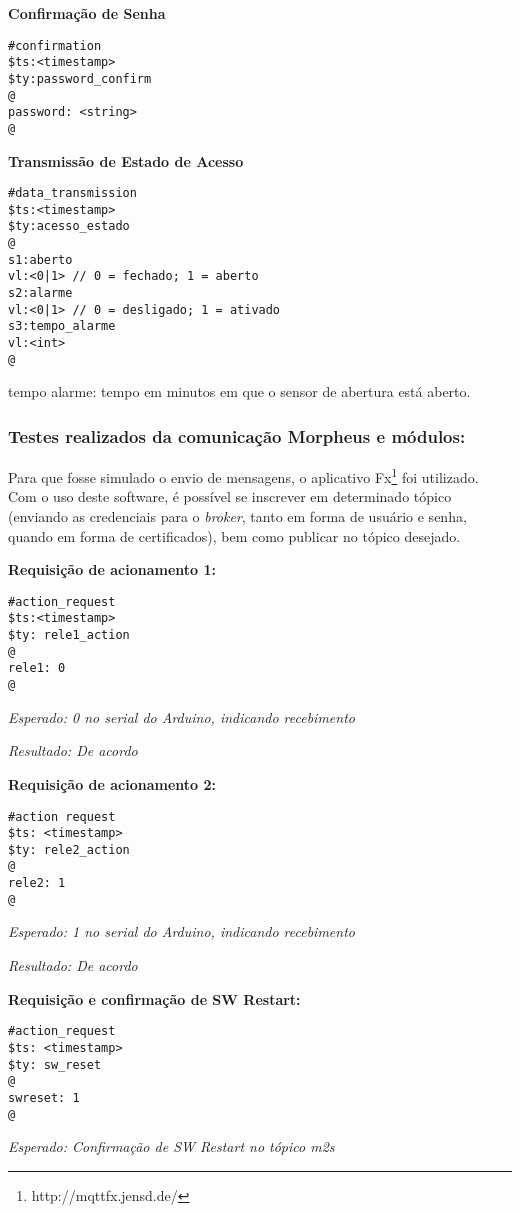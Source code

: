 \textbf{Confirmação de Senha}
\begin{lstlisting}
#confirmation
$ts:<timestamp>
$ty:password_confirm
@
password: <string>
@
\end{lstlisting}

\textbf{Transmissão de Estado de Acesso}
\begin{lstlisting}
#data_transmission
$ts:<timestamp>
$ty:acesso_estado
@
s1:aberto
vl:<0|1> // 0 = fechado; 1 = aberto
s2:alarme
vl:<0|1> // 0 = desligado; 1 = ativado
s3:tempo_alarme
vl:<int>
@
\end{lstlisting}

tempo alarme: tempo em minutos em que o sensor de abertura está aberto.

\subsubsection{Testes realizados da comunicação Morpheus e módulos:}

Para que fosse simulado o envio de mensagens, o aplicativo \wmqtt{} Fx\footnote{http://mqttfx.jensd.de/} foi utilizado. Com o uso deste software, é possível se inscrever em determinado tópico (enviando as credenciais para o \textit{broker}, tanto em forma de usuário e senha, quando em forma de certificados), bem como publicar no tópico desejado.

\textbf{Requisição de acionamento 1:}
\begin{lstlisting}
#action_request
$ts:<timestamp>
$ty: rele1_action
@
rele1: 0
@
\end{lstlisting}

\textit{Esperado: 0 no serial do Arduino, indicando recebimento}

\textit{Resultado: De acordo}

\textbf{Requisição de acionamento 2:}
\begin{lstlisting}
#action request
$ts: <timestamp>
$ty: rele2_action
@
rele2: 1
@
\end{lstlisting}

\textit{Esperado: 1 no serial do Arduino, indicando recebimento}

\textit{Resultado: De acordo}

\textbf{Requisição e confirmação de SW Restart:}
\begin{lstlisting}
#action_request
$ts: <timestamp>
$ty: sw_reset
@
swreset: 1
@
\end{lstlisting}

\textit{Esperado: Confirmação de SW Restart no tópico \wmqtt{} m2s}

